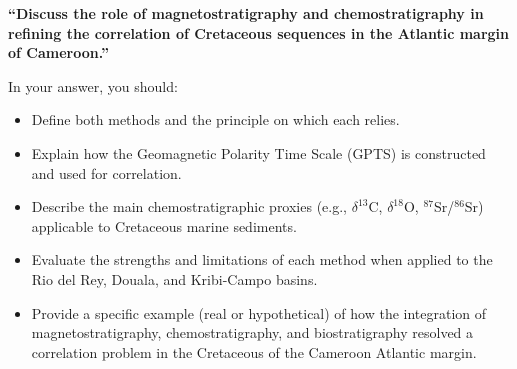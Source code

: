 \documentclass[11pt]{article}
\newcommand{\cle}[1]{{\popxbold\color{popdark}#1}}
\begin{document}
\begin{exercice}
\textbf{``Discuss the role of magnetostratigraphy and chemostratigraphy in refining the correlation of Cretaceous sequences in the Atlantic margin of Cameroon.''}

In your answer, you should:
\begin{itemize}
\item Define both methods and the principle on which each relies.
\item Explain how the \cle{Geomagnetic Polarity Time Scale (GPTS)} is constructed and used for correlation.
\item Describe the main \cle{chemostratigraphic} proxies (e.g., $\delta^{13}$C, $\delta^{18}$O, $^{87}$Sr/$^{86}$Sr) applicable to Cretaceous marine sediments.
\item Evaluate the strengths and limitations of each method when applied to the \cle{Rio del Rey}, \cle{Douala}, and \cle{Kribi-Campo} basins.
\item Provide a specific example (real or hypothetical) of how the integration of magnetostratigraphy, chemostratigraphy, and biostratigraphy resolved a correlation problem in the Cretaceous of the Cameroon Atlantic margin.
\end{itemize}
\end{exercice}
\end{document}
